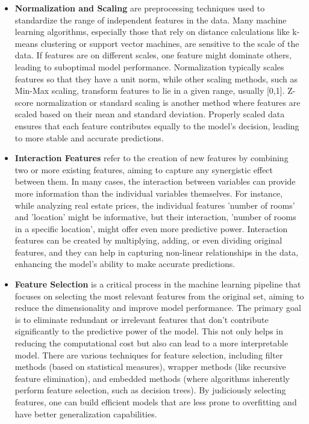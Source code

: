         \begin{itemize}
            \item \textbf{Normalization and Scaling }are preprocessing techniques used to standardize the range of independent features in the data. Many machine learning algorithms, especially those that rely on distance calculations like k-means clustering or support vector machines, are sensitive to the scale of the data. If features are on different scales, one feature might dominate others, leading to suboptimal model performance. Normalization typically scales features so that they have a unit norm, while other scaling methods, such as Min-Max scaling, transform features to lie in a given range, usually [0,1]. Z-score normalization or standard scaling is another method where features are scaled based on their mean and standard deviation. Properly scaled data ensures that each feature contributes equally to the model's decision, leading to more stable and accurate predictions.

            \item \textbf{Interaction Features\cite{khalid_survey_2014} }refer to the creation of new features by combining two or more existing features, aiming to capture any synergistic effect between them. In many cases, the interaction between variables can provide more information than the individual variables themselves. For instance, while analyzing real estate prices, the individual features 'number of rooms' and 'location' might be informative, but their interaction, 'number of rooms in a specific location', might offer even more predictive power. Interaction features can be created by multiplying, adding, or even dividing original features, and they can help in capturing non-linear relationships in the data, enhancing the model's ability to make accurate predictions.

            \item \textbf{Feature Selection\cite{khalid_survey_2014} }is a critical process in the machine learning pipeline that focuses on selecting the most relevant features from the original set, aiming to reduce the dimensionality and improve model performance. The primary goal is to eliminate redundant or irrelevant features that don't contribute significantly to the predictive power of the model. This not only helps in reducing the computational cost but also can lead to a more interpretable model. There are various techniques for feature selection, including filter methods (based on statistical measures), wrapper methods (like recursive feature elimination), and embedded methods (where algorithms inherently perform feature selection, such as decision trees). By judiciously selecting features, one can build efficient models that are less prone to overfitting and have better generalization capabilities.
        \end{itemize}

